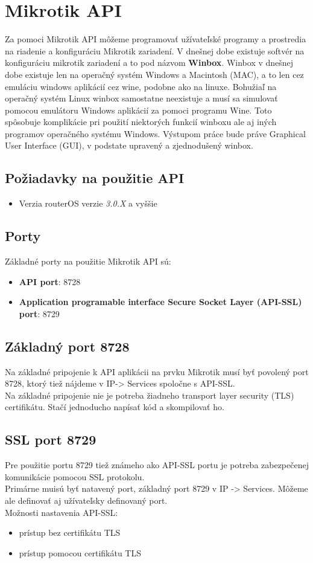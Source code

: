 \section{Mikrotik API}
Za pomoci Mikrotik API môžeme programovať užívateľské programy a prostredia na riadenie a konfiguráciu Mikrotik zariadení. V dnešnej dobe existuje softvér na konfiguráciu mikrotik zariadení a to pod názvom \textbf{Winbox}. Winbox v dnešnej dobe existuje len na operačný systém Windows a Macintosh (MAC), a to len cez emuláciu windows aplikácií cez wine, podobne ako na linuxe. Bohužiaľ na operačný systém Linux winbox samostatne neexistuje a musí sa simulovať pomocou emulátoru Windows aplikácií za pomoci programu Wine. Toto spôsobuje komplikácie pri použití niektorých funkcií winboxu ale aj iných programov operačného systému Windows. Výstupom práce bude práve Graphical User Interface (GUI), v podstate upravený a zjednodušený winbox. 
\subsection{Požiadavky na použitie API}
\begin{itemize}
\item Verzia routerOS verzie \textit{3.0.X} a vyššie \cite{API}
\end{itemize}
\subsection{Porty}
Základné porty na použitie Mikrotik API \cite{API} sú:
\begin{itemize}
\item \textbf{API port}: 8728
\item \textbf{Application programable interface Secure Socket Layer (API-SSL) port}: 8729
\end{itemize}
\subsection{Základný port 8728}
Na základné pripojenie k API aplikácii na prvku Mikrotik musí byť povolený port 8728, ktorý tiež nájdeme v IP-> Services spoločne s API-SSL.\\
Na základné pripojenie nie je potreba žiadneho transport layer security (TLS) certifikátu. Stačí jednoducho napísať kód a skompilovať ho. 
\subsection{SSL port 8729}
Pre použitie portu 8729 tiež známeho ako API-SSL portu je potreba zabezpečenej komunikácie pomocou SSL protokolu. \\
Primárne muisú byť natavený port, základný port 8729 v IP -> Services. Môžeme ale definovať aj užívateľsky definovaný port. \\
Možnosti nastavenia API-SSL:
\begin{itemize}
\item prístup bez certifikátu TLS
\item prístup pomocou certifikátu TLS
\end{itemize} 
